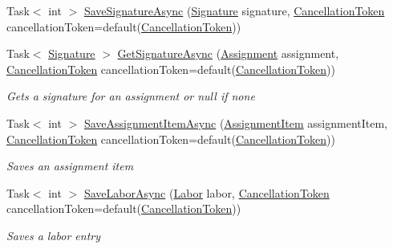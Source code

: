 \begin{DoxyCompactItemize}
Task$<$ int $>$ \hyperlink{class_field_service_1_1_data_1_1_sample_assignment_service_ab11c5c87b27c697baa71f49d2713ee25}{Save\+Signature\+Async} (\hyperlink{class_field_service_1_1_data_1_1_signature}{Signature} signature, \hyperlink{_view_models_2_assignment_view_model_8cs_aba80ec766846c61f55644fd23860cb18}{Cancellation\+Token} cancellation\+Token=default(\hyperlink{_view_models_2_assignment_view_model_8cs_aba80ec766846c61f55644fd23860cb18}{Cancellation\+Token}))
\item 
Task$<$ \hyperlink{class_field_service_1_1_data_1_1_signature}{Signature} $>$ \hyperlink{class_field_service_1_1_data_1_1_sample_assignment_service_af0171122c64c201f6ef56157f372f4db}{Get\+Signature\+Async} (\hyperlink{class_field_service_1_1_data_1_1_assignment}{Assignment} assignment, \hyperlink{_view_models_2_assignment_view_model_8cs_aba80ec766846c61f55644fd23860cb18}{Cancellation\+Token} cancellation\+Token=default(\hyperlink{_view_models_2_assignment_view_model_8cs_aba80ec766846c61f55644fd23860cb18}{Cancellation\+Token}))
\begin{DoxyCompactList}\small\item\em Gets a signature for an assignment or null if none \end{DoxyCompactList}\item 
Task$<$ int $>$ \hyperlink{class_field_service_1_1_data_1_1_sample_assignment_service_a6136f09aa1135bf6e5bdfa9b62ac73c4}{Save\+Assignment\+Item\+Async} (\hyperlink{class_field_service_1_1_data_1_1_assignment_item}{Assignment\+Item} assignment\+Item, \hyperlink{_view_models_2_assignment_view_model_8cs_aba80ec766846c61f55644fd23860cb18}{Cancellation\+Token} cancellation\+Token=default(\hyperlink{_view_models_2_assignment_view_model_8cs_aba80ec766846c61f55644fd23860cb18}{Cancellation\+Token}))
\begin{DoxyCompactList}\small\item\em Saves an assignment item \end{DoxyCompactList}\item 
Task$<$ int $>$ \hyperlink{class_field_service_1_1_data_1_1_sample_assignment_service_a8a1b798e7de83506a7919571786a64d4}{Save\+Labor\+Async} (\hyperlink{class_field_service_1_1_data_1_1_labor}{Labor} labor, \hyperlink{_view_models_2_assignment_view_model_8cs_aba80ec766846c61f55644fd23860cb18}{Cancellation\+Token} cancellation\+Token=default(\hyperlink{_view_models_2_assignment_view_model_8cs_aba80ec766846c61f55644fd23860cb18}{Cancellation\+Token}))
\begin{DoxyCompactList}\small\item\em Saves a labor entry \end{DoxyCompactList}\item 

\end{DoxyCompactItemize}
